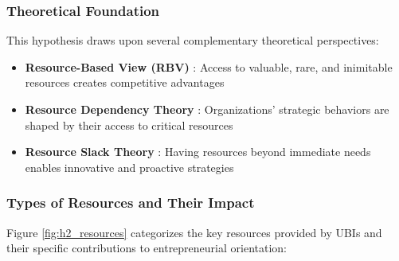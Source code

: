\documentclass[../Main.tex]{subfiles}
\begin{document}
    \subsubsection{Theoretical Foundation}
    This hypothesis draws upon several complementary theoretical perspectives:

    \begin{itemize}
        \item \textbf{Resource-Based View (RBV)} \cite{barney1991firm}: Access to valuable, rare, and inimitable resources creates competitive advantages
        \item \textbf{Resource Dependency Theory} \cite{pfeffer1978external}: Organizations' strategic behaviors are shaped by their access to critical resources
        \item \textbf{Resource Slack Theory} \cite{cyert1963behavioral}: Having resources beyond immediate needs enables innovative and proactive strategies
    \end{itemize}

    \subsubsection{Types of Resources and Their Impact}
    Figure \ref{fig:h2_resources} categorizes the key resources provided by UBIs and their specific contributions to entrepreneurial orientation:
\end{document}
